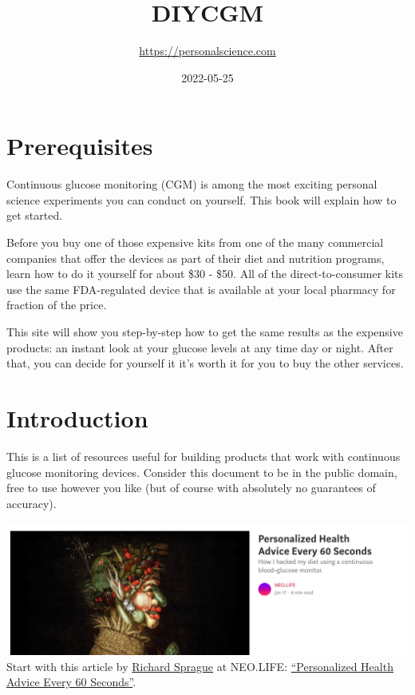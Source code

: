 \documentclass[
]{book}
\title{DIYCGM}
\author{\url{https://personalscience.com}}
\date{2022-05-25}
\begin{document}
\maketitle

{
\setcounter{tocdepth}{1}
\tableofcontents
}
\hypertarget{prerequisites}{%
\chapter{Prerequisites}\label{prerequisites}}

Continuous glucose monitoring (CGM) is among the most exciting personal science experiments you can conduct on yourself. This book will explain how to get started.

Before you buy one of those expensive kits from one of the many commercial companies that offer the devices as part of their diet and nutrition programs, learn how to do it yourself for about \$30 - \$50. All of the direct-to-consumer kits use the same FDA-regulated device that is available at your local pharmacy for fraction of the price.

This site will show you step-by-step how to get the same results as the expensive products: an instant look at your glucose levels at any time day or night. After that, you can decide for yourself it it's worth it for you to buy the other services.

\hypertarget{intro}{%
\chapter{Introduction}\label{intro}}

This is a list of resources useful for building products that work with continuous glucose monitoring devices. Consider this document to be in the public domain, free to use however you like (but of course with absolutely no guarantees of accuracy).

\includegraphics{images/sprague-neolife.png} Start with this article by \href{https://twitter.com/sprague}{Richard Sprague} at NEO.LIFE: \href{https://neo.life/2019/01/personalized-health-advice-every-60-seconds/}{``Personalized Health Advice Every 60 Seconds''}.
\end{document}

